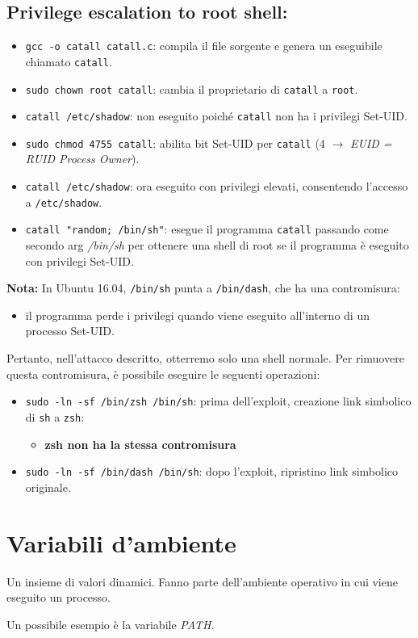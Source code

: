 \subsection{Privilege escalation to root shell:}
\begin{itemize}
    \item \texttt{gcc -o catall catall.c}: compila il file sorgente e genera un eseguibile chiamato \texttt{catall}.
    \item \texttt{sudo chown root catall}: cambia il proprietario di \texttt{catall} a \texttt{root}.
    \item \texttt{catall /etc/shadow}: non eseguito poiché \texttt{catall} non ha i privilegi Set-UID.
    \item \texttt{sudo chmod 4755 catall}: abilita bit Set-UID per \texttt{catall} (4 $\rightarrow$ \textit{EUID = RUID Process Owner}).
    \item \texttt{catall /etc/shadow}: ora eseguito con privilegi elevati, consentendo l'accesso a \texttt{/etc/shadow}.
    \item \texttt{catall "random; /bin/sh"}: esegue il programma \texttt{catall} passando come secondo arg \textit{/bin/sh} per ottenere una shell di root se il programma è eseguito con privilegi Set-UID.
\end{itemize}

\noindent \textbf{Nota:} In Ubuntu 16.04, \texttt{/bin/sh} punta a \texttt{/bin/dash}, che ha una contromisura: 
\begin{itemize}
    \item il programma perde i privilegi quando viene eseguito all'interno di un processo Set-UID. 
\end{itemize}
Pertanto, nell'attacco descritto, otterremo solo una shell normale. Per rimuovere questa contromisura, è possibile eseguire le seguenti operazioni:
\begin{itemize}
    \item \texttt{sudo -ln -sf /bin/zsh /bin/sh}: prima dell'exploit, creazione link simbolico di \texttt{sh} a \texttt{zsh}:
    \begin{itemize}
        \item \textbf{zsh non ha la stessa contromisura}
    \end{itemize}
    \item \texttt{sudo -ln -sf /bin/dash /bin/sh}: dopo l'exploit, ripristino link simbolico originale.
\end{itemize}

\section{Variabili d'ambiente}

Un insieme di valori dinamici. Fanno parte dell'ambiente operativo in cui viene eseguito un processo.

Un possibile esempio è la variabile \textit{PATH}.


